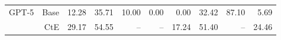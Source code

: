 \begin{table}[!t]
\begin{tabular}{r r !{\color{white!80!black} \vline} r r r r r !{\color{white!80!black} \vline} r r r}
 \sf GPT-5 & Base & \textcolor{blue!60!black}{12.28} & \textcolor{blue!60!black}{35.71} & \textcolor{blue!60!black}{10.00} & \textcolor{blue!60!black}{0.00} & \textcolor{blue!60!black}{0.00} & \textcolor{blue!60!black}{32.42} & \textcolor{blue!60!black}{87.10} & \textcolor{blue!60!black}{5.69} \\
 & CtE & \textcolor{blue!60!black}{29.17} & \textcolor{blue!60!black}{54.55} & \textcolor{blue!60!black}{--} & \textcolor{blue!60!black}{--} & \textcolor{blue!60!black}{17.24} & \textcolor{blue!60!black}{51.40} & \textcolor{blue!60!black}{--} & \textcolor{blue!60!black}{24.46} \\ 
\bottomrule
\end{tabular}
\label{tab:cRi-}
\end{table}
